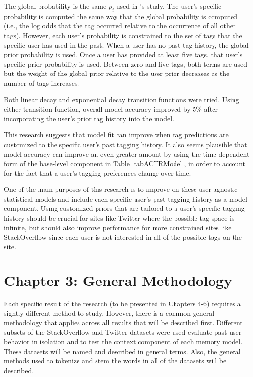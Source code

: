 \documentclass[man,floatsintext,donotrepeattitle]{apa6}
\begin{document}
The global probability is the same $p_{i}$ used in \textcite{Stanley2013}'s study.
The user's specific probability is computed the same way that the global probability is computed (i.e., the log odds that the tag occurred relative to the occurrence of all other tags).
However, each user's probability is constrained to the set of tags that the specific user has used in the past. 
When a user has no past tag history, the global prior probability is used.
Once a user has provided at least five tags, that user's specific prior probability is used.
Between zero and five tags, both terms are used but the weight of the global prior relative to the user prior decreases as the number of tags increases.

Both linear decay and exponential decay transition functions were tried.
Using either transition function, overall model accuracy improved by 5\% after incorporating the user's prior tag history into the model.

This research suggests that model fit can improve when tag predictions are customized to the specific user's past tagging history.
It also seems plausible that model accuracy can improve an even greater amount by using the time-dependent form of the base-level component in Table \ref{tabACTRModel},
in order to account for the fact that a user's tagging preferences change over time.

One of the main purposes of this research is to improve on these user-agnostic statistical models and include each specific user's past tagging history as a model component.
Using customized priors that are tailored to a user's specific tagging history should be crucial for sites like Twitter where the possible tag space is infinite,
but should also improve performance for more constrained sites like StackOverflow since each user is not interested in all of the possible tags on the site. 

\clearpage
\section{Chapter 3: General Methodology}

Each specific result of the research (to be presented in Chapters 4-6) requires a sightly different method to study.
However, there is a common general methodology that applies across all results that will be described first.
Different subsets of the StackOverflow and Twitter datasets were used evaluate past user behavior in isolation and to test the context component of each memory model.
These datasets will be named and described in general terms.
Also, the general methods used to tokenize and stem the words in all of the datasets will be described.
\end{document}
